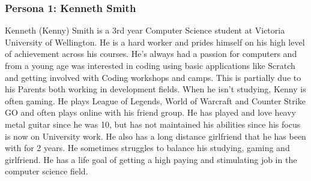 \subsubsection{Persona 1: Kenneth Smith}
Kenneth (Kenny) Smith is a 3rd year Computer Science student at Victoria University of Wellington. He is a hard worker and prides himself on his high level of achievement across his courses. He's always had a passion for computers and from a young age was interested in coding using basic applications like Scratch and getting involved with Coding workshops and camps. This is partially due to his Parents both working in development fields. When he isn't studying, Kenny is often gaming. He plays League of Legends, World of Warcraft and Counter Strike GO and often plays online with his friend group. He has played and love heavy metal guitar since he was 10, but has not maintained his abilities since his focus is now on University work. He also has a long distance girlfriend that he has been with for 2 years. He sometimes struggles to balance his studying, gaming and girlfriend. He has a life goal of getting a high paying and stimulating job in the computer science field. 

